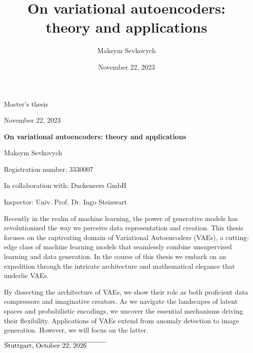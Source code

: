 \documentclass[12pt, a4paper]{scrreprt}
\title{On variational autoencoders: theory and applications}
\date{November 22, 2023}
\author{Maksym Sevkovych}
\theoremstyle{plain}
\theoremstyle{definition}
\theoremstyle{plain}
\begin{document}
\begin{titlepage}
\vspace*{1 cm}
\begin{center}
\LARGE{Master's thesis}

\vspace{0.5 cm}

\large{November 22, 2023}

\vspace{0.5 cm}

\Huge{\textbf{On variational autoencoders: theory and applications}}

\vspace{0.5 cm}

\Large{Maksym Sevkovych}

\Large{Registration number: 3330007}

\Large{In collaboration with: Duckeneers GmbH}
\vspace{1 cm}

\Large{Inspector: Univ. Prof. Dr. Ingo Steinwart}
\vspace{3cm}
\end{center}
Recently in the realm of machine learning, the power of generative models has revolutionized the way we perceive data representation and creation. This thesis focuses on the captivating domain of Variational Autoencoders (VAEs), a cutting-edge class of machine learning models that seamlessly combine unsupervised learning and data generation. In the course of this thesis we embark on an expedition through the intricate architecture and mathematical elegance that underlie VAEs.

By dissecting the architecture of VAEs, we show their role as both proficient data compressors and imaginative creators. As we navigate the landscapes of latent spaces and probabilistic encodings, we uncover the essential mechanisms driving their flexibility.
Applications of VAEs extend from anomaly detection to image generation. However, we will focus on the latter.
\end{titlepage}
\newpage
\tableofcontents







\vspace{4 cm}

$\overline{\text{Stuttgart, \today} \hspace{1 cm}}$
\end{document}
